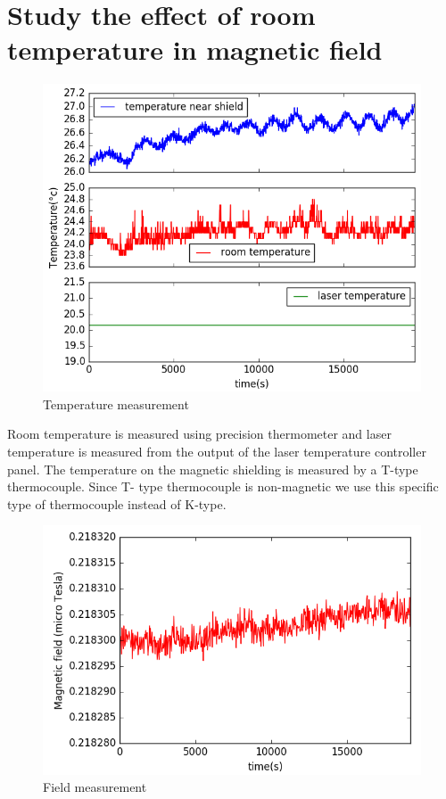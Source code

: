  \section{Study the effect of room temperature in magnetic field} 
 \begin{figure}[h]
\centering\includegraphics[width=0.8\linewidth]{figures/temp_.png}
\caption{Temperature measurement\label{fig:temperature measurement}}
\end{figure}
 Room temperature is measured using precision thermometer and laser temperature is measured from the output of the laser temperature controller panel. The temperature on the magnetic shielding is measured by a T-type thermocouple.  Since T- type thermocouple is non-magnetic we use this specific type of thermocouple instead of K-type. 
 
  \begin{figure}[h]
\centering\includegraphics[width=0.8\linewidth]{figures/field_.png}
\caption{Field measurement\label{fig:field}}
\end{figure}


